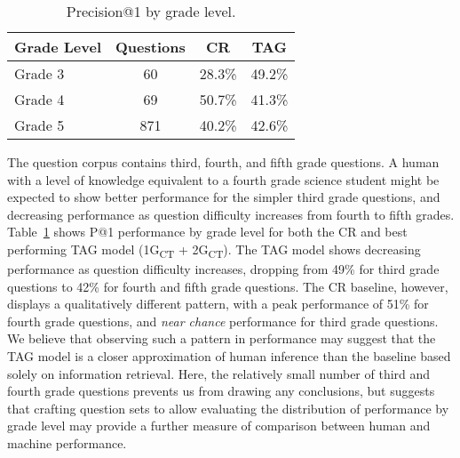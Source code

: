 %
%
\begin{table}[t]
\caption{{ \label{font-table} Precision@1 by grade level. }} %
\small
\begin{center}
\begin{tabular}{lccc}
\hline
\multicolumn{1}{c}{Grade Level} & \multicolumn{1}{c}{Questions} &\multicolumn{1}{c}{CR} & \multicolumn{1}{c}{TAG}  \\
\cline{2-3}
\hline
Grade 3 	& 60		&	28.3\%		& 49.2\%	\\
Grade 4		& 69 	&	50.7\%		& 41.3\%	\\
Grade 5		& 871	&	40.2\%		& 42.6\%	\\

\end{tabular}
\label{tab:gradelevel}
\end{center}
\end{table}


{} The question corpus contains third, fourth, and fifth grade questions.  A human with a level of knowledge equivalent to a fourth grade science student might be expected to show better performance for the simpler third grade questions, and decreasing performance as question difficulty increases from fourth to fifth grades.  Table~\ref{tab:gradelevel} shows P@1 performance by grade level for both the CR and best performing TAG model (1G\textsubscript{CT} + 2G\textsubscript{CT}).  The TAG model shows decreasing performance as question difficulty increases, dropping from 49\% for third grade questions to 42\% for fourth and fifth grade questions.  The CR baseline, however, displays a qualitatively different pattern, with a peak performance of 51\% for fourth grade questions, and {\em near chance} performance for third grade questions. 
We believe that observing such a pattern in performance may suggest that the TAG model is a closer approximation of human inference than the baseline based solely on information retrieval.  Here, the relatively small number of third and fourth grade questions prevents us from drawing any conclusions, but suggests that crafting question sets to allow evaluating the distribution of performance by grade level may provide a further measure of comparison between human and machine performance. 



